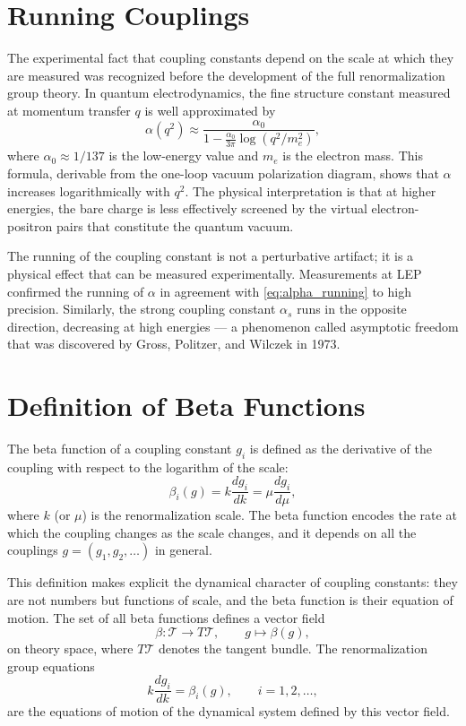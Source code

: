 \documentclass[11pt, twoside, openright]{book}
\theoremstyle{dotted}
\theoremstyle{definition}
\newcommand{\cT}{\mathcal{T}}          %
\begin{document}
\section{Running Couplings}

The experimental fact that coupling constants depend on the scale at which they
are measured was recognized before the development of the full renormalization
group theory. In quantum electrodynamics, the fine structure constant measured at
momentum transfer $q$ is well approximated by
\begin{equation}
  \alpha(q^2) \approx \frac{\alpha_0}{1 - \frac{\alpha_0}{3\pi}\log(q^2/m_e^2)},
  \label{eq:alpha_running}
\end{equation}
where $\alpha_0 \approx 1/137$ is the low-energy value and $m_e$ is the electron
mass. This formula, derivable from the one-loop vacuum polarization diagram, shows
that $\alpha$ increases logarithmically with $q^2$. The physical interpretation is
that at higher energies, the bare charge is less effectively screened by the
virtual electron-positron pairs that constitute the quantum vacuum.

The running of the coupling constant is not a perturbative artifact; it is a
physical effect that can be measured experimentally. Measurements at LEP confirmed
the running of $\alpha$ in agreement with \eqref{eq:alpha_running} to high precision.
Similarly, the strong coupling constant $\alpha_s$ runs in the opposite direction,
decreasing at high energies --- a phenomenon called asymptotic freedom that was
discovered by Gross, Politzer, and Wilczek in 1973.

\section{Definition of Beta Functions}

The beta function of a coupling constant $g_i$ is defined as the derivative of the
coupling with respect to the logarithm of the scale:
\begin{equation}
  \beta_i(g) = k \frac{d g_i}{d k} = \mu \frac{d g_i}{d \mu},
  \label{eq:beta_def}
\end{equation}
where $k$ (or $\mu$) is the renormalization scale. The beta function encodes the
rate at which the coupling changes as the scale changes, and it depends on all the
couplings $g = (g_1, g_2, \ldots)$ in general.

This definition makes explicit the dynamical character of coupling constants: they
are not numbers but functions of scale, and the beta function is their equation of
motion. The set of all beta functions defines a vector field
\begin{equation}
  \beta: \cT \to T\cT, \qquad g \mapsto \beta(g),
  \label{eq:beta_vector_field}
\end{equation}
on theory space, where $T\cT$ denotes the tangent bundle. The renormalization group
equations
\begin{equation}
  k\frac{dg_i}{dk} = \beta_i(g), \qquad i = 1, 2, \ldots,
  \label{eq:rge}
\end{equation}
are the equations of motion of the dynamical system defined by this vector field.
\end{document}
